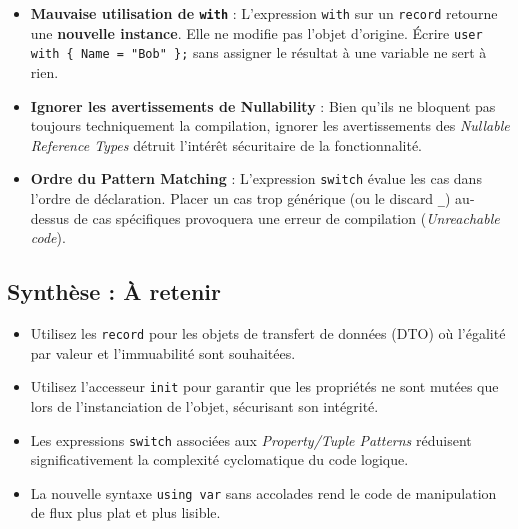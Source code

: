 \begin{tcolorbox}[colback=red!5!white,colframe=red!75!black,title=Pièges courants \& Erreurs de compilation]
\begin{itemize}
    \item \textbf{Mauvaise utilisation de \texttt{with}} : L'expression \texttt{with} sur un \texttt{record} retourne une \textbf{nouvelle instance}. Elle ne modifie pas l'objet d'origine. Écrire \texttt{user with \{ Name = "Bob" \};} sans assigner le résultat à une variable ne sert à rien.
    \item \textbf{Ignorer les avertissements de Nullability} : Bien qu'ils ne bloquent pas toujours techniquement la compilation, ignorer les avertissements des \textit{Nullable Reference Types} détruit l'intérêt sécuritaire de la fonctionnalité.
    \item \textbf{Ordre du Pattern Matching} : L'expression \texttt{switch} évalue les cas dans l'ordre de déclaration. Placer un cas trop générique (ou le discard \texttt{\_}) au-dessus de cas spécifiques provoquera une erreur de compilation (\textit{Unreachable code}).
\end{itemize}
\end{tcolorbox}

\subsection*{Synthèse : À retenir}
\begin{itemize}
    \item Utilisez les \texttt{record} pour les objets de transfert de données (DTO) où l'égalité par valeur et l'immuabilité sont souhaitées.
    \item Utilisez l'accesseur \texttt{init} pour garantir que les propriétés ne sont mutées que lors de l'instanciation de l'objet, sécurisant son intégrité.
    \item Les expressions \texttt{switch} associées aux \textit{Property/Tuple Patterns} réduisent significativement la complexité cyclomatique du code logique.
    \item La nouvelle syntaxe \texttt{using var} sans accolades rend le code de manipulation de flux plus plat et plus lisible.
\end{itemize}
